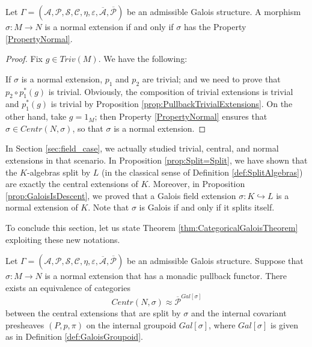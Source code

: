 \begin{proposition}
    Let $\Gamma = (\mathcal{A}, \mathcal{P}, \mathcal{S}, \mathcal{C}, \eta, \varepsilon, \overline{\mathcal{A}}, \overline{\mathcal{P}})$ be an admissible Galois structure. A morphism $\sigma:M\to N$ is a normal extension if and only if $\sigma$ has the Property \eqref{PropertyNormal}.
    \begin{proof}
        Fix $g\in Triv(M)$. We have the following:
        \begin{center}
        \end{center}
        If $\sigma$ is a normal extension, $p_1$ and $p_2$ are trivial; and we need to prove that $p_2\circ p_1^*(g)$ is trivial. Obviously, the composition of trivial extensions is trivial and $p_1^*(g)$ is trivial by Proposition \ref{prop:PullbackTrivialExtensions}. On the other hand, take $g=1_M$; then Property \eqref{PropertyNormal} ensures that $\sigma\in Centr(N,\sigma)$, so that $\sigma$ is a normal extension.
    \end{proof}
\end{proposition}

\begin{example}
    In Section \ref{sec:field_case}, we actually studied trivial, central, and normal extensions in that scenario. In Proposition \ref{prop:Split=Split}, we have shown that the $K$-algebras split by $L$ (in the classical sense of Definition \ref{def:SplitAlgebras}) are exactly the central extensions of $K$. Moreover, in Proposition \ref{prop:GaloisIsDescent}, we proved that a Galois field extension $\sigma:K\hookrightarrow L$ is a normal extension of $K$. Note that $\sigma$ is Galois if and only if it splits itself.
\end{example}

To conclude this section, let us state Theorem \ref{thm:CategoricalGaloisTheorem} exploiting these new notations.
\begin{theorem}
    Let $\Gamma = (\mathcal{A}, \mathcal{P}, \mathcal{S}, \mathcal{C}, \eta, \varepsilon, \overline{\mathcal{A}}, \overline{\mathcal{P}})$ be an admissible Galois structure. Suppose that $\sigma:M\to N$ is a normal extension that has a monadic pullback functor. There exists an equivalence of categories
    \[ Centr(N,\sigma) \approx \overline{\mathcal{P}}^{Gal[\sigma]} \]
    between the central extensions that are split by $\sigma$ and the internal covariant presheaves $(P,p,\pi)$ on the internal groupoid $Gal[\sigma]$, where $Gal[\sigma]$ is given as in Definition \ref{def:GaloisGroupoid}.
\end{theorem}


